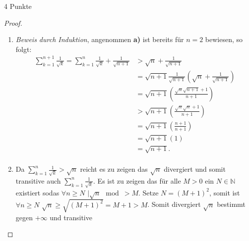 \documentclass{problemset}
\begin{document}
\begin{problem}{4 Punkte}
\begin{proof}
    \begin{enumerate}
        \item \textit{Beweis durch Induktion}, angenommen \textbf{a)} ist bereits für $n=2$ bewiesen, so folgt: \begin{align*}
                  \sum_{k=1}^{n+1} \frac{1}{\sqrt{k}} = \sum_{k=1}^{n} \frac{1}{\sqrt{k}} + \frac{1}{\sqrt{n + 1}} & > \sqrt{n} + \frac{1}{\sqrt{n + 1}}                                              \\
                                                                                                                   & = \sqrt{n+1} \frac{1}{\sqrt{n+1}} \left(\sqrt{n} + \frac{1}{\sqrt{n + 1}}\right) \\
                                                                                                                   & = \sqrt{n+1} \left(\frac{\sqrt{n}\sqrt{n+1} + 1}{n + 1}\right)                   \\
                                                                                                                   & > \sqrt{n+1} \left(\frac{\sqrt{n}\sqrt{n} + 1}{n + 1}\right)                     \\
                                                                                                                   & = \sqrt{n+1} \left(\frac{n + 1}{n + 1}\right)                                    \\
                                                                                                                   & = \sqrt{n+1} (1)                                                                 \\
                                                                                                                   & = \sqrt{n+1} \tag*{\checkmark}.                                                  \\
              \end{align*}
        \item Da $\sum_{k=1}^{n} \frac{1}{\sqrt{k}} > \sqrt{n}$ reicht es zu zeigen das
              $\sqrt{n}$ divergiert und somit transitive auch $\sum_{k=1}^{n}
                  \frac{1}{\sqrt{k}}$. Es ist zu zeigen das für alle $M > 0$ ein $N \in
                  \mathbb{N}$ existiert sodas $\forall n \ge N$ $\mid \sqrt{n} \mod > M$. Setze
              $N = {(M + 1)}^2$, somit ist $\forall n \ge N$ $\sqrt{n} \ge \sqrt{{(M + 1)}^2}
                  = M+1 > M$. Somit divergiert $\sqrt{n}$ bestimmt gegen $+\infty$ und transitive

\end{enumerate}
\end{proof}
\end{problem}
\end{document}
